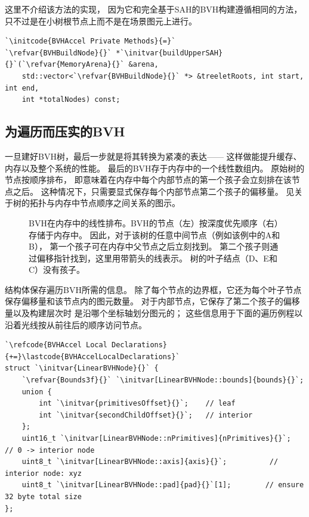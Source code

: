 这里不介绍该方法的实现，
因为它和完全基于SAH的BVH构建遵循相同的方法，
只不过是在小树根节点上而不是在场景图元上进行。
\begin{lstlisting}
`\initcode{BVHAccel Private Methods}{=}`
`\refvar{BVHBuildNode}{}` *`\initvar{buildUpperSAH}{}`(`\refvar{MemoryArena}{}` &arena,
    std::vector<`\refvar{BVHBuildNode}{}` *> &treeletRoots, int start, int end,
    int *totalNodes) const;
\end{lstlisting}

\subsection{为遍历而压实的BVH}\label{sub:为遍历而压实的BVH}
一旦建好BVH树，最后一步就是将其转换为紧凑的表达——
这样做能提升缓存、内存以及整个系统的性能。
最后的BVH存于内存中的一个线性数组内。
原始树的节点按顺序排布，
即意味着在内存中每个内部节点的第一个孩子会立刻排在该节点之后。
这种情况下，只需要显式保存每个内部节点第二个孩子的偏移量。
见关于树的拓扑与内存中节点顺序之间关系的图示。
\begin{figure}[htbp]
    \centering
    \caption{BVH在内存中的线性排布。BVH的节点（左）按深度优先顺序（右）存储于内存中。
        因此，对于该树的任意中间节点（例如该例中的A和B），
        第一个孩子可在内存中父节点之后立刻找到。
        第二个孩子则通过偏移指针找到，这里用带箭头的线表示。
        树的叶子结点（D、E和C）没有孩子。}
    \label{fig:4.13}
\end{figure}

结构体保存遍历BVH所需的信息。
除了每个节点的边界框，它还为每个叶子节点保存偏移量和该节点内的图元数量。
对于内部节点，它保存了第二个孩子的偏移量以及构建层次时
是沿哪个坐标轴划分图元的；
这些信息用于下面的遍历例程以沿着光线按从前往后的顺序访问节点。
\begin{lstlisting}
`\refcode{BVHAccel Local Declarations}{+=}\lastcode{BVHAccelLocalDeclarations}`
struct `\initvar{LinearBVHNode}{}` {
    `\refvar{Bounds3f}{}` `\initvar[LinearBVHNode::bounds]{bounds}{}`;
    union {
        int `\initvar{primitivesOffset}{}`;    // leaf
        int `\initvar{secondChildOffset}{}`;   // interior
    };
    uint16_t `\initvar[LinearBVHNode::nPrimitives]{nPrimitives}{}`;  // 0 -> interior node
    uint8_t `\initvar[LinearBVHNode::axis]{axis}{}`;          // interior node: xyz
    uint8_t `\initvar[LinearBVHNode::pad]{pad}{}`[1];        // ensure 32 byte total size
};
\end{lstlisting}

